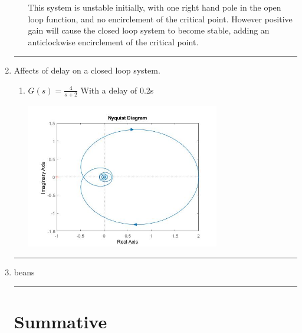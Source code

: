 \documentclass[a4paper,11pt]{article}
\begin{document}
\begin{preview}
\begin{enumerate}
\begin{enumerate}
      This system is unstable initially, with one right hand pole in the open loop function, and no encirclement of the critical point. However positive gain will cause the closed loop system to become stable, adding an anticlockwise encirclement of the critical point.\\
    \end{enumerate}


\hrule

\item Affects of delay on a closed loop system.

\begin{enumerate}
  
  \item $ G(s) = \frac{4}{s+2} $ With a delay of 0.2s
  
  \begin{center}
    \includegraphics[width=0.7\textwidth]{A_1/2_a_nyquist.jpg}
  \end{center}
  

\end{enumerate}

\hrule
  
\item beans\\

\hrule

\section*{Summative}





\end{enumerate}
\end{preview}
\end{document}
